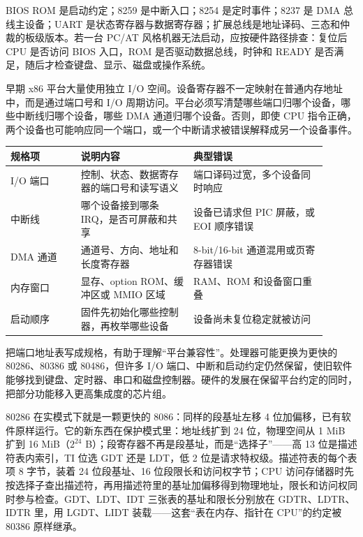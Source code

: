 BIOS ROM 是启动约定；8259 是中断入口；8254 是定时事件；8237 是 DMA 总线主设备；UART 是状态寄存器与数据寄存器；扩展总线是地址译码、三态和仲裁的板级版本。若一台 PC/AT 风格机器无法启动，应按硬件路径排查：复位后 CPU 是否访问 BIOS 入口，ROM 是否驱动数据总线，时钟和 READY 是否满足，随后才检查键盘、显示、磁盘或操作系统。

早期 x86 平台大量使用独立 I/O 空间。设备寄存器不一定映射在普通内存地址中，而是通过端口号和 I/O 周期访问。平台必须写清楚哪些端口归哪个设备，哪些中断线归哪个设备，哪些 DMA 通道归哪个设备。否则，即使 CPU 指令正确，两个设备也可能响应同一个端口，或一个中断请求被错误解释成另一个设备事件。

\begin{longtable}{L{0.2\linewidth}L{0.32\linewidth}L{0.38\linewidth}}
\toprule
规格项 & 说明内容 & 典型错误 \\
\midrule
I/O 端口 & 控制、状态、数据寄存器的端口号和读写语义 & 端口译码过宽，多个设备同时响应 \\
中断线 & 哪个设备接到哪条 IRQ，是否可屏蔽和共享 & 设备已请求但 PIC 屏蔽，或 EOI 顺序错误 \\
DMA 通道 & 通道号、方向、地址和长度寄存器 & 8-bit/16-bit 通道混用或页寄存器错误 \\
内存窗口 & 显存、option ROM、缓冲区或 MMIO 区域 & RAM、ROM 和设备窗口重叠 \\
启动顺序 & 固件先初始化哪些控制器，再枚举哪些设备 & 设备尚未复位稳定就被访问 \\
\bottomrule
\end{longtable}

把端口地址表写成规格，有助于理解“平台兼容性”。处理器可能更换为更快的 80286、80386 或 80486，但许多 I/O 端口、中断和启动约定仍然保留，使旧软件能够找到键盘、定时器、串口和磁盘控制器。硬件的发展在保留平台约定的同时，把部分功能移入更高集成度的芯片组。

80286 在实模式下就是一颗更快的 8086：同样的段基址左移 4 位加偏移，已有软件原样运行。它的新东西在保护模式里：地址线扩到 24 位，物理空间从 1 MiB 扩到 16 MiB（$2^{24}$ B）；段寄存器不再是段基址，而是“选择子”——高 13 位是描述符表内索引，TI 位选 GDT 还是 LDT，低 2 位是请求特权级。描述符表的每个表项 8 字节，装着 24 位段基址、16 位段限长和访问权字节；CPU 访问存储器时先按选择子查出描述符，再用描述符里的基址加偏移得到物理地址，限长和访问权同时参与检查。GDT、LDT、IDT 三张表的基址和限长分别放在 GDTR、LDTR、IDTR 里，用 LGDT、LIDT 装载——这套“表在内存、指针在 CPU”的约定被 80386 原样继承。


